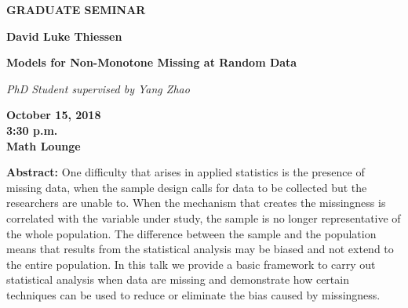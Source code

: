 \documentclass[12pt]{article}
\begin{document}
\begin{center}
\sffamily
\Huge\textbf{GRADUATE SEMINAR}

\bigskip
\LARGE\textbf{David Luke Thiessen}

\bigskip
\textbf{Models for Non-Monotone Missing at Random Data}

\bigskip
\large
\textit{PhD Student supervised by Yang Zhao}

\Large
\bigskip
\textbf{October 15, 2018
\\3:30 p.m.
\\Math Lounge
}
\end{center}

\bigskip

\sffamily\large\noindent\textbf{Abstract:} 
One difficulty that arises in applied statistics is the presence of missing data, when the sample design calls for data to be collected but the researchers are unable to. When the mechanism that creates the missingness is correlated with the variable under study, the sample is no longer representative of the whole population. The difference between the sample and the population means that results from the statistical analysis may be biased and not extend to the entire population. In this talk we provide a basic framework to carry out statistical analysis when data are missing and demonstrate how certain techniques can be used to reduce or eliminate the bias caused by missingness.


 
\end{document}
